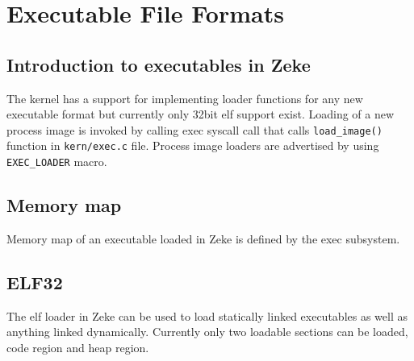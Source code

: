 
\chapter{Executable File Formats}

\section{Introduction to executables in Zeke}

The kernel has a support for implementing loader functions for any new
executable format but currently only 32bit \acf{elf} support exist.
Loading of a new process image is invoked by calling exec syscall call that
calls \verb+load_image()+ function in \verb+kern/exec.c+ file.
Process image loaders are advertised by using \verb+EXEC_LOADER+ macro.

\section{Memory map}

Memory map of an executable loaded in Zeke is defined by the exec subsystem.


\section{ELF32}

The \acs{elf} loader in Zeke can be used to load statically linked executables
as well as anything linked dynamically. Currently only two loadable sections can
be loaded, code region and heap region.
